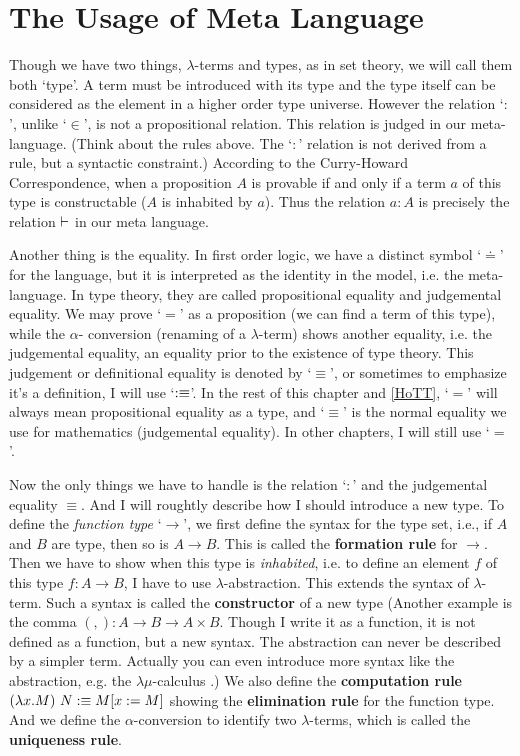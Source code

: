 \section{The Usage of Meta Language}
Though we have two things, $\lambda$-terms and types, as in set theory,
we will call them both `type'. A term must be introduced with its type 
and the type itself can be considered as the element in a higher order 
type universe. However the relation `$:$', unlike `$\in$', is not a 
propositional relation. This relation is judged in our meta-language. 
(Think about the rules above. The `$:$' relation is not derived from a 
rule, but a syntactic constraint.) According to the Curry-Howard 
Correspondence, when a proposition $A$ is provable if and only if a term 
$a$ of this type is constructable ($A$ is inhabited by $a$). Thus the 
relation $a:A$ is precisely the relation $\vdash$ in our meta language. 

Another thing is the equality. In first order logic, we have a distinct
symbol `$\doteq$' for the language, but it is interpreted as the identity
in the model, i.e. the meta-language. In type theory, they are called
propositional equality and judgemental equality. We may prove `$=$' as
a proposition (we can find a term of this type), while the $\alpha$-
conversion (renaming of a $\lambda$-term) shows another equality, i.e.
the judgemental equality, an equality prior to the existence of type
theory. This judgement or definitional equality is denoted by `$\equiv$',
or sometimes to emphasize it's a definition, I will use `$:\equiv$'. In 
the rest of this chapter and \autoref{HoTT}, `$=$' will always mean
propositional equality as a type, and `$\equiv$' is the normal equality
we use for mathematics (judgemental equality). In other chapters, I will 
still use `$=$'. 

Now the only things we have to handle is the relation `$:$' and the 
judgemental equality $\equiv$. And I will roughtly describe how I should
introduce a new type. To define the {\it function type} `$\to$', we first 
define the syntax for the type set, i.e., if $A$ and $B$ are type, then 
so is $A\to B$. This is called the {\bf formation rule} for $\to$. Then 
we have to show when this type is {\it inhabited}, i.e. to define an 
element $f$ of this type $f:A\to B$, I have to use $\lambda$-abstraction. 
This extends the syntax of $\lambda$-term. Such a syntax is called the 
{\bf constructor} of a new type (Another example is the comma 
$(,): A\to B\to A\times B$. Though I write it as a function, it is not 
defined as a function, but a new syntax. The abstraction can never be 
described by a simpler term. Actually you can even introduce more syntax 
like the abstraction, e.g. the $\lambda\mu$-calculus 
\cite{lambda-mu-calculus}.) We also define the {\bf computation rule} 
$(\lambda x. M)\ N :\equiv M[x:=M]$ showing the {\bf elimination rule} 
for the function type. And we define the $\alpha$-conversion to identify 
two $\lambda$-terms, which is called the {\bf uniqueness rule}.


